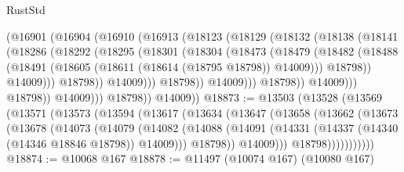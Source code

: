 \begin{lexlean}{RustStd}
\begin{coremodule}
                          (@16901
                            (@16904
                              (@16910
                                (@16913
                                  (@18123
                                    (@18129
                                      (@18132
                                        (@18138
                                          (@18141
                                            (@18286
                                              (@18292
                                                (@18295
                                                  (@18301
                                                    (@18304
                                                      (@18473
                                                        (@18479
                                                          (@18482
                                                            (@18488
                                                              (@18491
                                                                (@18605
                                                                  (@18611
                                                                    (@18614 (@18795 @18798))
                                                                    @14009)))
                                                              @18798))
                                                          @14009)))
                                                    @18798))
                                                @14009)))
                                          @18798))
                                      @14009)))
                                @18798))
                            @14009)))
                      @18798))
                  @14009)))
            @18798))
        @14009))
@18873 := @13503
    (@13528
      (@13569
        (@13571
          (@13573
            (@13594
              (@13617
                (@13634
                  (@13647
                    (@13658
                      (@13662
                        (@13673
                          (@13678
                            (@14073
                              (@14079
                                (@14082
                                  (@14088
                                    (@14091
                                      (@14331 (@14337 (@14340 (@14346 @18846 @18798)) @14009)))
                                    @18798))
                                @14009)))
                          @18798)))))))))))
@18874 := @10068 @167
@18878 := @11497 (@10074 @167) (@10080 @167)

\end{coremodule}
\end{lexlean}
